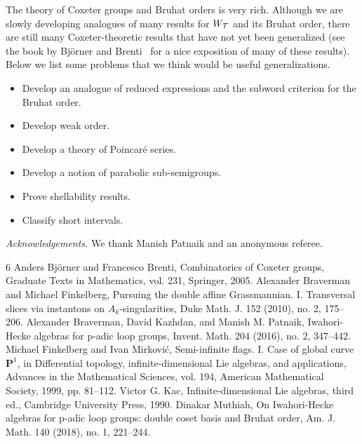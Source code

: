 \documentclass[10pt]{amsart}
\begin{document}
The theory of Coxeter groups and Bruhat orders is very rich. Although we are slowly developing analogues of many results for $W_{\mathcal{T}}$ and its Bruhat order, there are still many Coxeter-theoretic results that have not yet been generalized (see the book by Bj\"{o}rner and Brenti~\cite{BB} for a nice exposition of many of these results). Below we list some problems that we think would be useful generalizations.
\begin{itemize}
\item Develop an analogue of reduced expressions and the subword criterion for the Bruhat order.
\item Develop weak order.
\item Develop a theory of Poincaré series.
\item Develop a notion of parabolic sub-semigroups.
\item Prove shellability results.
\item Classify short intervals.
\end{itemize}

\par\textit{Acknowledgements.} We thank Manish Patnaik and an anonymous referee.

\begin{thebibliography}{6}
 Anders Björner and Francesco Brenti, Combinatorics of Coxeter groups, Graduate Texts in Mathematics, vol. 231, Springer, 2005.
 Alexander Braverman and Michael Finkelberg, Pursuing the double affine Grassmannian. I. Transversal slices via instantons on $A_k$-singularities, Duke Math. J. 152 (2010), no. 2, 175--206.
 Alexander Braverman, David Kazhdan, and Manish M. Patnaik, Iwahori-Hecke algebras for p-adic loop groups, Invent. Math. 204 (2016), no. 2, 347--442.
 Michael Finkelberg and Ivan Mirković, Semi-infinite flags. I. Case of global curve $\mathbf{P}^1$, in Differential topology, infinite-dimensional Lie algebras, and applications, Advances in the Mathematical Sciences, vol. 194, American Mathematical Society, 1999, pp. 81--112.
 Victor G. Kac, Infinite-dimensional Lie algebras, third ed., Cambridge University Press, 1990.
 Dinakar Muthiah, On Iwahori-Hecke algebras for p-adic loop groups: double coset basis and Bruhat order, Am. J. Math. 140 (2018), no. 1, 221--244.
\end{thebibliography}
\end{document}
